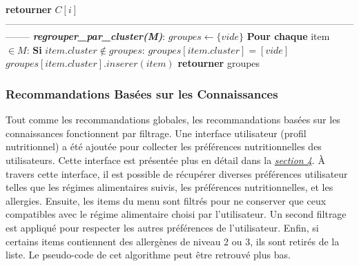 \documentclass[11pt]{article}
\begin{document}
\begin{algorithm}
\begin{algorithmic}[1]
        \State \hspace{0.5cm} \textbf{retourner} $C[i]$
        \\
--------------------------------------------------------------------------------------------------------------------
		\State \textbf{\textit{regrouper\_par\_cluster(M)}}:
		\State \hspace{0.5cm} $groupes \leftarrow \{vide\}$
		\State \hspace{0.5cm} \textbf{Pour chaque} item $\in M$:
		\State \hspace{1cm} \textbf{Si} $item.cluster \notin groupes$:
		\State \hspace{1.5cm} $groupes[item.cluster] = [vide]$
		\State \hspace{1cm} $groupes[item.cluster].inserer(item)$
		\State \hspace{0.5cm} \textbf{retourner} groupes 
		
    \end{algorithmic}
\end{algorithm}

\subsubsection{Recommandations Basées sur les Connaissances}
Tout comme les recommandations globales, les recommandations basées sur les connaissances fonctionnent par filtrage. Une interface utilisateur (profil nutritionnel) a été ajoutée pour collecter les préférences nutritionnelles des utilisateurs. Cette interface est présentée plus en détail dans la \hyperref[implementation]{\textit{section 4}}. À travers cette interface, il est possible de récupérer diverses préférences utilisateur telles que les régimes alimentaires suivis, les préférences nutritionnelles, et les allergies. Ensuite, les items du menu sont filtrés pour ne conserver que ceux compatibles avec le régime alimentaire choisi par l'utilisateur. Un second filtrage est appliqué pour respecter les autres préférences de l'utilisateur. Enfin, si certains items contiennent des allergènes de niveau 2 ou 3, ils sont retirés de la liste. Le pseudo-code de cet algorithme peut être retrouvé plus bas.
\end{document}
